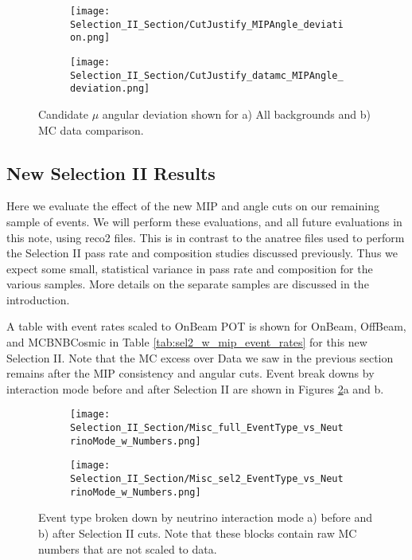 \documentclass{article}
\begin{document}
\begin{figure}[t!]
\centering
  \begin{subfigure}[t]{0.35\textwidth}
    \centering
\texttt{[image: Selection\_II\_Section/CutJustify\_MIPAngle\_deviation.png]}
    \caption{ }
  \end{subfigure} 
  \hspace{30mm}
  \begin{subfigure}[t]{0.35\textwidth}
    \centering
\texttt{[image: Selection\_II\_Section/CutJustify\_datamc\_MIPAngle\_deviation.png]}
    \caption{ }
  \end{subfigure} 
\caption{ Candidate $\mu$ angular deviation shown for a) All backgrounds and b) MC data comparison. }
\label{fig:cutjust_sel2_multall_deviation}
\end{figure}

\clearpage

\subsection{New Selection II Results}
Here we evaluate the effect of the new MIP and angle cuts on our remaining sample of events.  We will perform these evaluations, and all future evaluations in this note, using reco2 files. This is in contrast to the anatree files used to perform the Selection II pass rate and composition studies discussed previously. Thus we expect some small, statistical variance in pass rate and composition for the various samples.  More details on the separate samples are discussed in the introduction.
\par A table with event rates scaled to OnBeam POT is shown for OnBeam, OffBeam, and MCBNBCosmic in Table \ref{tab:sel2_w_mip_event_rates} for this new Selection II. Note that the MC excess over Data we saw in the previous section remains after the MIP consistency and angular cuts. Event break downs by interaction mode before and after Selection II are shown in Figures \ref{fig:physics_sel2_inttype}a and b.  
\begin{figure}[t!]
\centering
  \begin{subfigure}[t]{0.35\textwidth}
    \centering
\texttt{[image: Selection\_II\_Section/Misc\_full\_EventType\_vs\_NeutrinoMode\_w\_Numbers.png]}
    \caption{ }
  \end{subfigure} 
  \hspace{20 mm}
  \begin{subfigure}[t]{0.35\textwidth}
    \centering
\texttt{[image: Selection\_II\_Section/Misc\_sel2\_EventType\_vs\_NeutrinoMode\_w\_Numbers.png]}
    \caption{ }
  \end{subfigure} 

\caption{ Event type broken down by neutrino interaction mode a) before and b) after Selection II cuts. Note that these blocks contain raw MC numbers that are not scaled to data. }
\label{fig:physics_sel2_inttype}
\end{figure}
\end{document}
